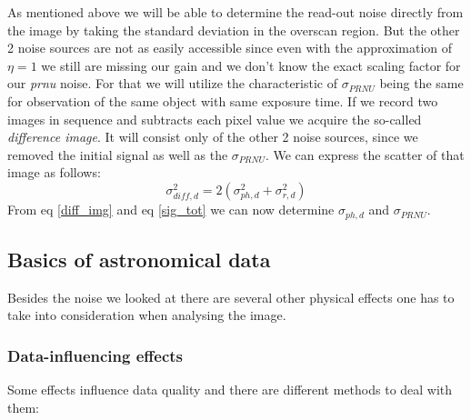 As mentioned above we will be able to determine the read-out noise directly from the image by taking the standard deviation in the overscan region. But the other 2 noise sources are not as easily accessible since even with the approximation of $\eta = 1$ we still are missing our gain and we don't know the exact scaling factor for our \textit{prnu} noise. For that we will utilize the characteristic of $\sigma_{PRNU}$ being the same for observation of the same object with same exposure time. If we record two images in sequence and subtracts each pixel value we acquire the so-called \textit{difference image}. It will consist only of the other 2 noise sources, since we removed the initial signal as well as the $\sigma_{PRNU}$. We can express the scatter of that image as follows:
\begin{equation}\label{diff_img}
	\sigma_{diff,d}^2 = 2(\sigma_{ph,d}^2 + \sigma_{r,d}^2)
\end{equation}
From eq \eqref{diff_img} and eq \eqref{sig_tot} we can now determine $\sigma_{ph,d}$ and $\sigma_{PRNU}$.
\hspace{4mm}
\subsection{Basics of astronomical data} \label{astrodata}
Besides the noise we looked at there are several other physical effects one has to take into consideration when analysing the image.

\subsubsection{Data-influencing effects}
Some effects influence data quality and there are different methods to deal with them:

